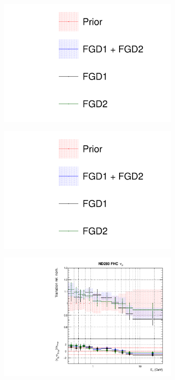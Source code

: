 \begin{figure}
\centering
\begin{subfigure}{0.3\textwidth}
  \centering
  \includegraphics[width=1.0\linewidth, trim={5mm  90mm 0mm 0mm}, clip]{figs/fgdfits_leg}
\end{subfigure}
\begin{subfigure}{0.3\textwidth}
  \centering
  \includegraphics[width=1.0\linewidth, trim={5mm  0mm 0mm 95mm}, clip]{figs/fgdfits_leg}
\end{subfigure}
\begin{subfigure}{0.45\textwidth}
  \centering
  \includegraphics[width=0.75\linewidth]{figs/fgdfitsflux_0}

\end{subfigure}
\end{figure}
